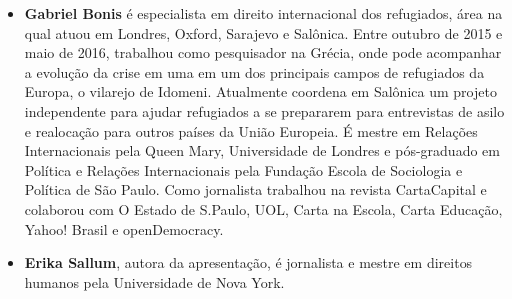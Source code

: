 \begin{itemize}


\item \textbf{Gabriel Bonis} 
  é especialista em direito internacional dos refugiados, área na
  qual atuou em Londres, Oxford, Sarajevo e Salônica. Entre outubro de 2015 e
  maio de 2016, trabalhou como pesquisador na Grécia, onde pode acompanhar a evolução da crise em uma
  em um dos principais campos de refugiados da Europa, o vilarejo de Idomeni.
  Atualmente coordena em Salônica um projeto independente para ajudar
  refugiados a se prepararem para entrevistas de asilo e realocação para outros
  países da União Europeia. É mestre em Relações Internacionais pela Queen
  Mary, Universidade de Londres e pós-graduado em Política e Relações
  Internacionais pela Fundação Escola de Sociologia e Política de São Paulo.
  Como jornalista trabalhou na revista CartaCapital e colaborou com O Estado de
  S.Paulo, UOL, Carta na Escola, Carta Educação, Yahoo! Brasil e openDemocracy.
  
\item \textbf{Erika Sallum}, autora da apresentação, é jornalista e mestre em direitos humanos pela Universidade de Nova York. 
\end{itemize}

